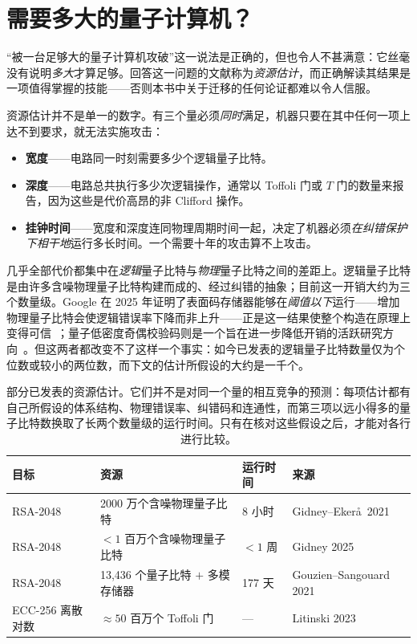 \section{需要多大的量子计算机？}
\label{sec:resource-estimates}

“被一台足够大的量子计算机攻破”这一说法是正确的，但也令人不甚满意：它丝毫没有说明\emph{多大}才算足够。回答这一问题的文献称为\emph{资源估计}，而正确解读其结果是一项值得掌握的技能——否则本书中关于迁移的任何论证都难以令人信服。

资源估计并不是单一的数字。有三个量必须\emph{同时}满足，机器只要在其中任何一项上达不到要求，就无法实施攻击：

\begin{itemize}
  \item \textbf{宽度}——电路同一时刻需要多少个逻辑量子比特。
  \item \textbf{深度}——电路总共执行多少次逻辑操作，通常以 Toffoli 门或 $T$ 门的数量来报告，因为这些是代价高昂的非 Clifford 操作。
  \item \textbf{挂钟时间}——宽度和深度连同物理周期时间一起，决定了机器必须\emph{在纠错保护下相干地}运行多长时间。一个需要十年的攻击算不上攻击。
\end{itemize}

几乎全部代价都集中在\emph{逻辑}量子比特与\emph{物理}量子比特之间的差距上。逻辑量子比特是由许多含噪物理量子比特构建而成的、经过纠错的抽象；目前这一开销大约为三个数量级。Google 在 2025 年证明了表面码存储器能够在\emph{阈值以下}运行——增加物理量子比特会使逻辑错误率下降而非上升——正是这一结果使整个构造在原理上变得可信~\cite{googleqec2025}；量子低密度奇偶校验码则是一个旨在进一步降低开销的活跃研究方向~\cite{bravyi2024}。但这两者都改变不了这样一个事实：如今已发表的逻辑量子比特数量仅为个位数或较小的两位数，而下文的估计所假设的大约是一千个。

\begin{table}[H]
\centering
\small
\begin{tabular}{@{}llll@{}}
\toprule
目标 & 资源 & 运行时间 & 来源 \\
\midrule
RSA-2048 & 2000 万个含噪物理量子比特 & 8 小时 & Gidney--Eker\aa\ 2021~\cite{gidneyekera2021} \\
RSA-2048 & $<1$ 百万个含噪物理量子比特 & $<1$ 周 & Gidney 2025~\cite{gidney2025qubits} \\
RSA-2048 & 13{,}436 个量子比特 $+$ 多模存储器 & 177 天 & Gouzien--Sangouard 2021~\cite{gouziensangouard2021} \\
ECC-256 离散对数 & $\approx 50$ 百万个 Toffoli 门 & --- & Litinski 2023~\cite{litinski2023} \\
\bottomrule
\end{tabular}
\caption{部分已发表的资源估计。它们并不是对同一个量的相互竞争的预测：每项估计都有自己所假设的体系结构、物理错误率、纠错码和连通性，而第三项以远小得多的量子比特数换取了长两个数量级的运行时间。只有在核对这些假设之后，才能对各行进行比较。}
\label{tab:resource-estimates}
\end{table}

